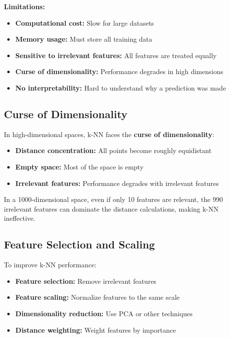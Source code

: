 \textbf{Limitations:}
\begin{itemize}
    \item \textbf{Computational cost:} Slow for large datasets
    \item \textbf{Memory usage:} Must store all training data
    \item \textbf{Sensitive to irrelevant features:} All features are treated equally
    \item \textbf{Curse of dimensionality:} Performance degrades in high dimensions
    \item \textbf{No interpretability:} Hard to understand why a prediction was made
\end{itemize}

\subsection{Curse of Dimensionality}

In high-dimensional spaces, k-NN faces the \textbf{curse of dimensionality}:

\begin{itemize}
    \item \textbf{Distance concentration:} All points become roughly equidistant
    \item \textbf{Empty space:} Most of the space is empty
    \item \textbf{Irrelevant features:} Performance degrades with irrelevant features
\end{itemize}

\begin{example}
In a 1000-dimensional space, even if only 10 features are relevant, the 990 irrelevant features can dominate the distance calculations, making k-NN ineffective.
\end{example}

\subsection{Feature Selection and Scaling}

To improve k-NN performance:

\begin{itemize}
    \item \textbf{Feature selection:} Remove irrelevant features
    \item \textbf{Feature scaling:} Normalize features to the same scale
    \item \textbf{Dimensionality reduction:} Use PCA or other techniques
    \item \textbf{Distance weighting:} Weight features by importance
\end{itemize}

